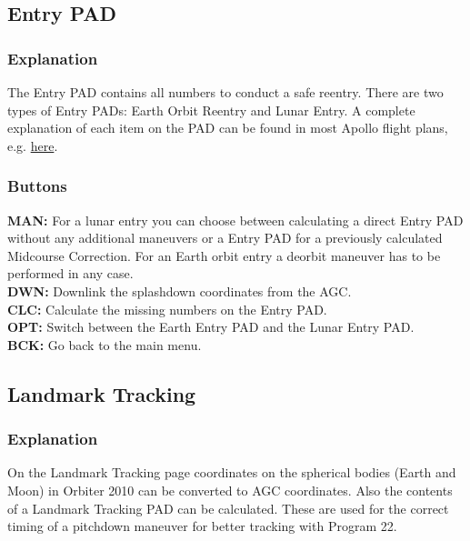 \documentclass[11pt]{article} %
\begin{document}
\subsection{Entry PAD}

\subsubsection{Explanation}

The Entry PAD contains all numbers to conduct a safe reentry. There are two types of Entry PADs: Earth Orbit Reentry and Lunar Entry. A complete explanation of each item on the PAD can be found in most Apollo flight plans, e.g. \href{http://history.nasa.gov/alsj/a11/a11fltpln_final_reformat.pdf}{here}. \\

\subsubsection{Buttons}

\textbf{MAN:} For a lunar entry you can choose between calculating a direct Entry PAD without any additional maneuvers or a Entry PAD for a previously calculated Midcourse Correction. For an Earth orbit entry a deorbit maneuver has to be performed in any case.\\
\textbf{DWN:} Downlink the splashdown coordinates from the AGC.\\
\textbf{CLC:} Calculate the missing numbers on the Entry PAD.\\
\textbf{OPT:} Switch between the Earth Entry PAD and the Lunar Entry PAD.\\
\textbf{BCK:} Go back to the main menu.\\
\newpage
\subsection{Landmark Tracking}

\subsubsection{Explanation}

On the Landmark Tracking page coordinates on the spherical bodies (Earth and Moon) in Orbiter 2010 can be converted to AGC coordinates. Also the contents of a Landmark Tracking PAD can be calculated. These are used for the correct timing of a pitchdown maneuver for better tracking with Program 22.
\end{document}
